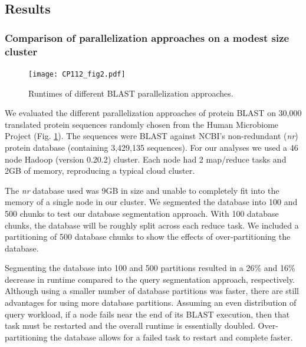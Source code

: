 \documentclass[12pt,\mydriver]{thesis}
\begin{document}
\subsection{Results}

\subsubsection{Comparison of parallelization approaches on a modest size cluster}

\begin{figure}[!htb]\begin{center}
\texttt{[image: CP112\_fig2.pdf]}
\end{center}
\renewcommand{\baselinestretch}{1}
\small\normalsize
\begin{quote}
\caption[Runtimes of different BLAST parallelization approaches]{Runtimes of different BLAST parallelization approaches.}
\label{fig:parallel_approaches}
\end{quote}
\end{figure}
\renewcommand{\baselinestretch}{2}
\small\normalsize


We evaluated the different parallelization approaches of protein BLAST on 30,000 translated protein sequences randomly chosen from the Human Microbiome Project\cite{peterson2009nih} (Fig. \ref{fig:parallel_approaches}).
The sequences were BLAST against NCBI's non-redundant (\emph{nr}) protein database (containing 3,429,135 sequences).
For our analyses we used a 46 node Hadoop (version 0.20.2) cluster.  Each node had 2 map/reduce tasks and 2GB of memory, reproducing a typical cloud cluster.

The \emph{nr} database used was 9GB in size and unable to completely fit into the memory of a single node in our cluster.
We segmented the database into 100 and 500 chunks to test our database segmentation approach.
With 100 database chunks, the database will be roughly split across each reduce task.
We included a partitioning of 500 database chunks to show the effects of over-partitioning the database.

Segmenting the database into 100 and 500 partitions resulted in a 26\% and 16\% decrease in runtime compared to the query segmentation approach, respectively.
Although using a smaller number of database partitions was faster, there are still advantages for using more database partitions.
Assuming an even distribution of query workload, if a node fails near the end of its BLAST execution, then that task must be restarted and the overall runtime is essentially doubled.
Over-partitioning the database allows for a failed task to restart and complete faster.
\end{document}
